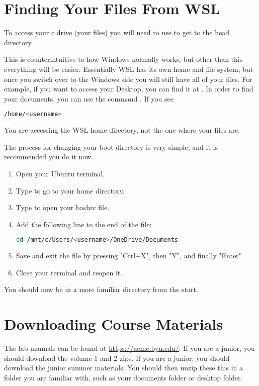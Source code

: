 \section*{Finding Your Files From WSL}
\begin{warn}
To access your c drive (your files) you will need to use  to get to the head directory.
\end{warn}
This is counterintuitive to how Windows normally works, but other than this everything will be easier.
Essentially WSL has its own home and file system, but once you switch over to the Windows side you will still have all of your files.
For example, if you want to access your Desktop, you can find it at .
In order to find your documents, you can use the command .
If you see 
\begin{lstlisting}[language=bash]
/home/<username>
\end{lstlisting}
You are accessing the WSL home directory, not the one where your files are.

The process for changing your boot directory is very simple, and it is recommended you do it now.
\begin{enumerate}
    \item Open your Ubuntu terminal.
    \item Type  to go to your home directory.
    \item Type  to open your bashrc file.
    \item Add the following line to the end of the file:
    \begin{lstlisting}[language=bash]
    cd /mnt/c/Users/<username>/OneDrive/Documents
    \end{lstlisting}
    \item Save and exit the file by pressing "Ctrl+X", then "Y", and finally "Enter".
    \item Close your terminal and reopen it.
\end{enumerate}
\fi
You should now be in a more familiar directory from the start.
\section*{Downloading Course Materials}
The lab manuals can be found at \url{https://acme.byu.edu/}.
\ifbootcamp
If you are a junior, you should download the volume 1 and 2 zips. 
\else
If you are a junior, you should download the junior summer materials.
\fi
You should then unzip 
\ifbootcamp
these
\else
this
\fi
in a folder you are familiar with, such as your documents folder or desktop folder.

